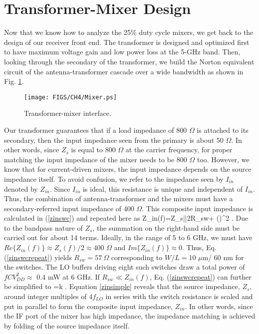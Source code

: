 \section{Transformer-Mixer Design}
Now that we know how to analyze the 25\% duty cycle mixers, we get back to the design of our receiver front end. The transformer is designed and
optimized first to have maximum voltage gain and low power loss at the 5-GHz band. Then, looking through the secondary of the transformer, we build
the Norton equivalent circuit of the antenna-transformer cascade over a wide bandwidth as shown in Fig. \ref{fig:mixer}.
\begin{figure}[htb!]
\centering
\texttt{[image: FIGS/CH4/Mixer.ps]}
\caption{Transformer-mixer interface.}
\label{fig:mixer}
\end{figure}
Our transformer guarantees that if a load impedance of 800 $\Omega$ is attached to its secondary, then the input impedance seen from the primary is about
50 $\Omega$.  In other words, since $Z_s$ is equal to 800 $\Omega$ at the carrier frequency, for proper matching the input impedance of the mixer needs to be
800 $\Omega$ too. However, we know that for current-driven mixers, the input impedance depends on the source impedance itself. To avoid confusion, we
refer to the impedance seen by $I_{in}$ denoted by $Z_{in}$. Since $I_{in}$ is ideal, this resistance is unique and independent of $I_{in}$. Thus, the
combination of antenna-transformer and the mixers must have a secondary-referred input impedance of 400 $\Omega$. This composite input impedance is
calculated in (\ref{zinswc}) and repeated here as
\beq
Z_{in}(f)=Z_s||2R_{sw}+ ()^2 \div {}.
\label{zinswcrepeat}
\eeq
Due to the bandpass nature of $Z_s$, the summation on the right-hand side must be carried out for about 14 terms. Ideally, in the range of 5 to 6 GHz,
we must have $Re\{Z_{in}(f)\} \approx Z_s(f)/2 \approx 400$ $\Omega$ and $Im\{Z_{in}(f)\} \approx 0$. Thus, Eq. (\ref{zinswcrepeat})
yields $R_{sw}=57~\Omega$ corresponding to  $W/L=$10 $\mu$m/ 60 nm for the switches. The LO buffers driving eight such switches draw a total power of
$fCV_{DD}^2 \approx$ 0.4 mW at 6 GHz.
If $R_{sw} \ll Z_{in}(f)$, Eq. (\ref{zinswcrepeat}) can further be simplified to
\beq
{}=\SumAll k .
\label{zinsimple}
\eeq
Equation \ref{zinsimple} reveals that the source impedance, $Z_s$, around integer multiples of $4 f_{LO}$ in series with the switch resistance
is scaled and put in parallel to form the composite input impedance, $Z_{in}$. In other words, since the IF port of the mixer has high impedance, the
impedance matching is achieved by folding of the source impedance itself.



